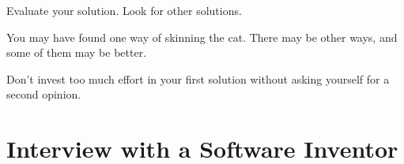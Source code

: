\begin{tip}
Evaluate your solution. Look for other solutions.
\end{tip}
You may have found one way of skinning the cat. There may be other
ways, and some of them may be better.

Don't invest too much effort in your first solution without asking
yourself for a second opinion.
%


\section{Interview with a Software Inventor}

